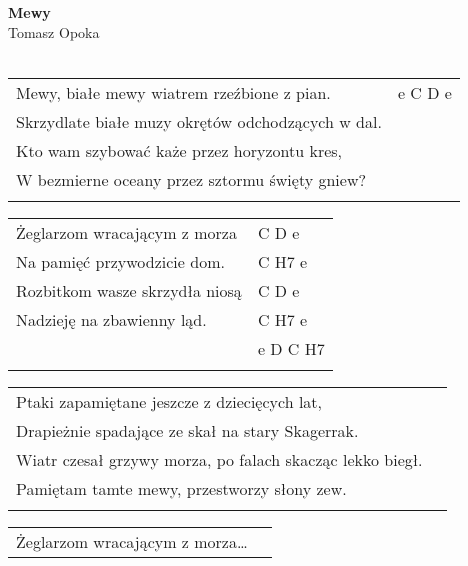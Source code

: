 \documentclass[a5paper]{article}
\begin{document}


\noindent
\fontsize{12pt}{15pt}\selectfont
\textbf{Mewy} \\
\fontsize{8pt}{10pt}\selectfont
Tomasz Opoka \\ \\
\fontsize{10pt}{12pt}\selectfont
{}
\begin{tabular}{@{}p{8.50cm}p{3cm}@{}}
\noindent
Mewy, białe mewy wiatrem rzeźbione z pian. & e C D e \\
Skrzydlate białe muzy okrętów odchodzących w dal. \\
Kto wam szybować każe przez horyzontu kres, \\
W bezmierne oceany przez sztormu święty gniew? \\ \\
\end{tabular}

\noindent
\begin{tabular}{@{}p{7.50cm}p{3cm}@{}}
Żeglarzom wracającym z morza & C D e \\
Na pamięć przywodzicie dom. & C H7 e \\
Rozbitkom wasze skrzydła niosą & C D e \\
Nadzieję na zbawienny ląd. & C H7 e \\
& e D C H7 \\ \\
\end{tabular}

\noindent
\begin{tabular}{@{}p{9.50cm}p{3cm}@{}}
Ptaki zapamiętane jeszcze z dziecięcych lat, \\
Drapieżnie spadające ze skał na stary Skagerrak. \\
Wiatr czesał grzywy morza, po falach skacząc lekko biegł.\\
Pamiętam tamte mewy, przestworzy słony zew.\\ \\
\end{tabular}

\noindent
\begin{tabular}{@{}p{7.50cm}p{3cm}@{}}
Żeglarzom wracającym z morza…
\end{tabular}
\end{document}
